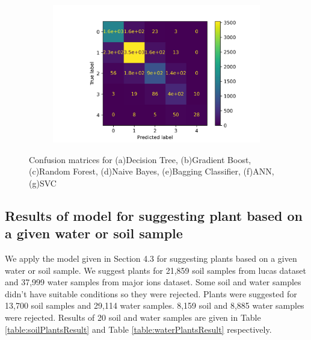 \begin{figure}[H]
\begin{subfigure}{.49\textwidth}
  \centering
  \includegraphics[width=\linewidth]{SVCConfusionMatrix.png}  
  \caption{}
  \label{subfig:svc}
\end{subfigure}


\caption{Confusion matrices for (a)Decision Tree, (b)Gradient Boost, (c)Random Forest, (d)Naive Bayes, (e)Bagging Classifier, (f)ANN, (g)SVC}
\label{fig:confusionMatrixForAllAlgos}
\end{figure}

\subsection{Results of model for suggesting plant based on a given water or soil sample}
\label{subsection:finalResults}
We apply the model given in Section 4.3 for suggesting plants based on a given water or soil sample. We suggest plants for 21,859 soil samples from lucas dataset\cite{dataset:lucas} and 37,999 water samples from major ions dataset\cite{dataset:majorIons}. Some soil and water samples didn't have suitable conditions so they were rejected. Plants were suggested for 13,700 soil samples and 29,114 water samples. 8,159 soil and 8,885 water samples were rejected. Results of 20 soil and water samples are given in Table \ref{table:soilPlantsResult} and Table \ref{table:waterPlantsResult} respectively.


